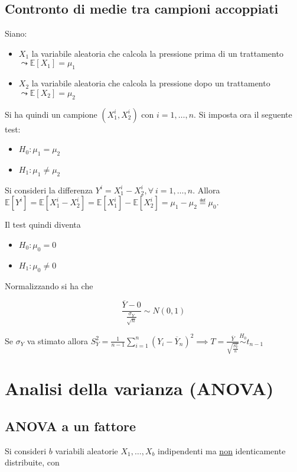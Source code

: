 \documentclass[hidelinks, 10pt]{report}
\begin{document}
\subsection{Contronto di medie tra campioni accoppiati} 
Siano:
\begin{itemize}
\item $ X_{1} $ la variabile aleatoria che calcola la pressione prima di un trattamento $ \leadsto \mathbb{E} [X_{1}] = \mu_{1} $
\item $ X_{2} $ la variabile aleatoria che calcola la pressione dopo un trattamento $ \leadsto \mathbb{E} [X_{2}] = \mu_{2} $
\end{itemize}

Si ha quindi un campione $ (X_{1}^{i}, X_{2}^{i}) $ con $ i = 1, \dotsc, n $. Si imposta ora il seguente test:

\begin{itemize}
\item $ H_{0} : \mu_{1} = \mu_{2} $
\item $ H_{1} : \mu_{1} \ne \mu_{2} $
\end{itemize}

Si consideri la differenza $ Y^{i} = X_{1}^{i} - X_{2}^{i}, \forall\ i = 1, \dotsc, n $. Allora $ \mathbb{E} [Y^{i}] = \mathbb{E} [X_{1}^{i} - X_{2}^{i}] = \mathbb{E} [X_{1}^{i}] - \mathbb{E} [X_{2}^{i}] = \mu_{1} - \mu_{2} \eqdef \mu_{0} $.

Il test quindi diventa
\begin{itemize}
\item $ H_{0} : \mu_{0} = 0 $
\item $ H_{1} : \mu_{0} \ne 0 $
\end{itemize}

Normalizzando si ha che

\[ \frac{\overline{Y} - 0}{\frac{\sigma_{Y}}{\sqrt{n}}} \sim N(0,1) \]

Se $ \sigma_{Y} $ va stimato allora $ S_{Y}^{2} = \frac{1}{n - 1} \sum\limits_{i = 1}^{n} (Y_{i} - \overline{Y}_{n})^{2} \implies T = \frac{\overline{Y}}{\sqrt{\frac{S_{Y}^{2}}{n}}} \stackrel{H_{0}}{\sim} t_{n - 1} $
\begin{defn}
\end{defn}

\section{Analisi della varianza (ANOVA)}
\subsection{ANOVA a un fattore}
Si consideri $ b $ variabili aleatorie $ X_{1}, \dotsc, X_{b} $ indipendenti ma \underline{non} identicamente distribuite, con
\end{document}
